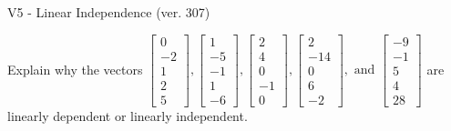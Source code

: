 \begin{exercise}
  \begin{exerciseTitle}V5 - Linear Independence (ver. 307)\end{exerciseTitle}
  \begin{exerciseStatement}
    Explain why the vectors \(\left[\begin{array}{r}
0 \\
-2 \\
1 \\
2 \\
5
\end{array}\right] , \left[\begin{array}{r}
1 \\
-5 \\
-1 \\
1 \\
-6
\end{array}\right] , \left[\begin{array}{r}
2 \\
4 \\
0 \\
-1 \\
0
\end{array}\right] , \left[\begin{array}{r}
2 \\
-14 \\
0 \\
6 \\
-2
\end{array}\right] , \text{ and } \left[\begin{array}{r}
-9 \\
-1 \\
5 \\
4 \\
28
\end{array}\right]\) are linearly dependent or linearly independent.	



\end{exerciseStatement}
\end{exercise}
